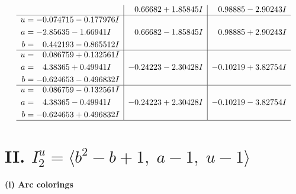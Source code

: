 \documentclass[1p]{elsarticle_modified}
\theoremstyle{definition}
\begin{document}
$$\begin{array}{c|c|c}
 & \phantom{-}0.66682 + 1.85845 I & \phantom{-}0.98885 - 2.90243 I \\ \hline\begin{aligned}
u &= -0.074715 - 0.177976 I \\
a &= -2.85635 - 1.66941 I \\
b &= \phantom{-}0.442193 - 0.865512 I\end{aligned}
 & \phantom{-}0.66682 - 1.85845 I & \phantom{-}0.98885 + 2.90243 I \\ \hline\begin{aligned}
u &= \phantom{-}0.086759 + 0.132561 I \\
a &= \phantom{-}4.38365 + 0.49941 I \\
b &= -0.624653 - 0.496832 I\end{aligned}
 & -0.24223 - 2.30428 I & -0.10219 + 3.82754 I \\ \hline\begin{aligned}
u &= \phantom{-}0.086759 - 0.132561 I \\
a &= \phantom{-}4.38365 - 0.49941 I \\
b &= -0.624653 + 0.496832 I\end{aligned}
 & -0.24223 + 2.30428 I & -0.10219 - 3.82754 I\\
 \hline 
 \end{array}$$\newpage\newpage\renewcommand{\arraystretch}{1}
\centering \section*{II. $I^u_{2}= \langle b^2- b+1,\;a-1,\;u-1 \rangle$}
\flushleft \textbf{(i) Arc colorings}\\
\end{document}
